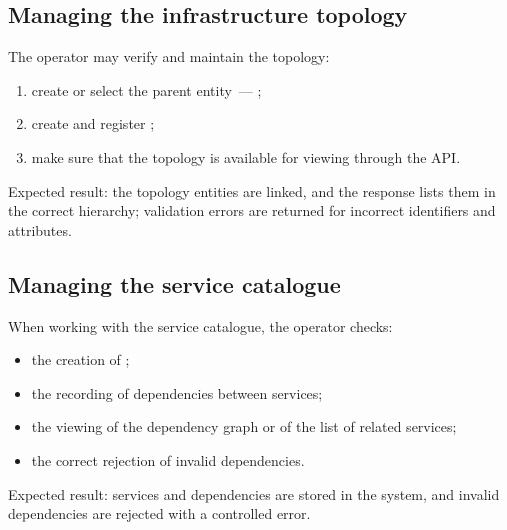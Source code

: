 \documentclass[12pt,a4paper]{extarticle}
\begin{document}
\subsection{Managing the infrastructure topology}

\begin{hseExample}
The operator may verify and maintain the topology:

\begin{enumerate}[label=\arabic*), leftmargin=1.25cm]
    \item create or select the parent entity~--- ;
    \item create  and register ;
    \item make sure that the topology is available for viewing through the API.
\end{enumerate}

Expected result: the topology entities are linked, and the response lists them in the correct hierarchy; validation errors are returned for incorrect identifiers and attributes.
\end{hseExample}

\subsection{Managing the service catalogue}

\begin{hseExample}
When working with the service catalogue, the operator checks:

\begin{itemize}[leftmargin=1.25cm]
    \item the creation of ;
    \item the recording of dependencies between services;
    \item the viewing of the dependency graph or of the list of related services;
    \item the correct rejection of invalid dependencies.
\end{itemize}

Expected result: services and dependencies are stored in the system, and invalid dependencies are rejected with a controlled error.
\end{hseExample}
\end{document}
